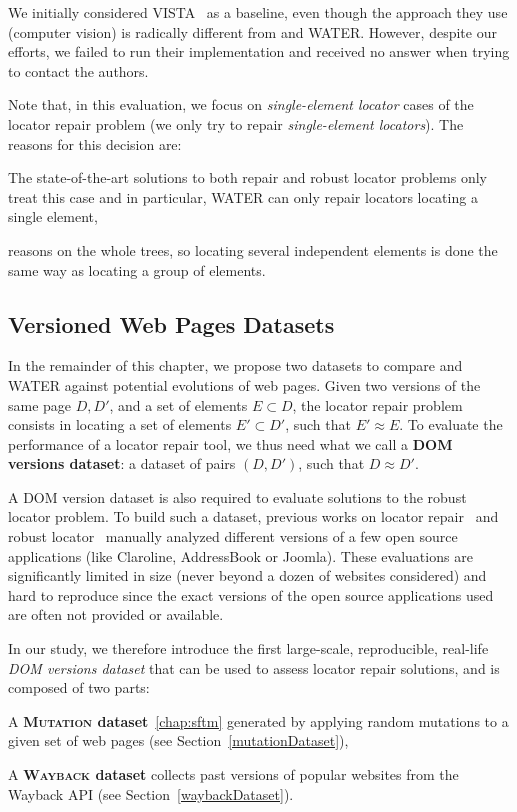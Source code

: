 We initially considered VISTA~\cite{stocco2018visual} as a baseline, even though the approach they use (computer vision) is radically different from \erratum{} and WATER.
However, despite our efforts, we failed to run their implementation and received no answer when trying to contact the authors. 

Note that, in this evaluation, we focus on \textit{single-element locator} cases of the locator repair problem (we only try to repair \textit{single-element locators}).
The reasons for this decision are:
\begin{inparaenum}
    \item The state-of-the-art solutions to both repair and robust locator problems only treat this case and in particular, WATER can only repair locators locating a single element,
    \item \erratum{} reasons on the whole trees, so locating several independent elements is done the same way as locating a group of elements.
\end{inparaenum}

\subsection{Versioned Web Pages Datasets}
In the remainder of this chapter, we propose two datasets to compare \erratum{} and WATER against potential evolutions of web pages.
Given two versions of the same page $D, D'$, and a set of elements $E \subset D$, the locator repair problem consists in locating a set of elements $E' \subset D'$, such that $E' \approx E$.
To evaluate the performance of a locator repair tool, we thus need what we call a \textbf{DOM versions dataset}: a dataset of pairs $(D, D')$, such that $D \approx D'$.

A DOM version dataset is also required to evaluate solutions to the robust locator problem.
To build such a dataset, previous works on locator repair~\cite{leotta2016robula+,leotta2014reducing} and robust locator~\cite{stocco2018visual,choudhary2011water,hammoudi2016waterfall} manually analyzed different versions of a few open source applications (like Claroline, AddressBook or Joomla).
These evaluations are significantly limited in size (never beyond a dozen of websites considered) and hard to reproduce since the exact versions of the open source applications used are often not provided or available.

In our study, we therefore introduce the first large-scale, reproducible, real-life \textit{DOM versions dataset} that can be used to assess locator repair solutions, and is composed of two parts:
\begin{compactenum}
    \item A {\bf \textsc{Mutation} dataset}~\ref{chap:sftm} generated by applying random mutations to a given set of web pages (see Section~\ref{mutationDataset}),
    \item A {\bf \textsc{Wayback} dataset} collects past versions of popular websites from the Wayback API (see Section~\ref{waybackDataset}).
\end{compactenum}

